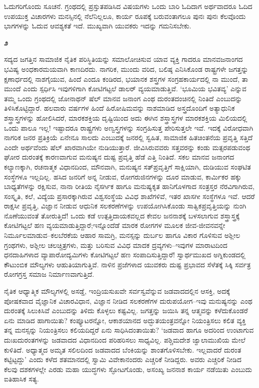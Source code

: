 ಓದುಗರಿಗೊಂದು ಸೂಚನೆ. ಗ್ರಂಥದಲ್ಲಿ ಪ್ರಸ್ತುತಪಡಿಸಿದ ವಿಷಯಗಳು ಒಂದು ಬಾರಿ ಓದಿದಾಗ ಅರ್ಥವಾದರೂ ಓದಿದ ಉಪಯುಕ್ತ ವಿಚಾರಗಳು ಮನಸ್ಸಿನಲ್ಲಿ ನೆಲೆನಿಲ್ಲಲೂ, ಕಾರ್ಯ ರೂಪಕ್ಕೆ ಬರುವಂತಾಗಲೂ ಪುನಃ ಪುನಃ ಕೆಲವೊಂದು ಭಾಗಗಳನ್ನು ಓದುವ ಆವಶ್ಯಕತೆ ಇದೆ. ಮುಖ್ಯವಾಗಿ ಯುವಕರು ಇದನ್ನು ಗಮನಿಸಬೇಕು.

\newpage

\medskip\centerline{{\Large\bfseries ೨}}

ಸದ್ಯದ ಜಗತ್ತಿನ ಸಾಮಾಜಿಕ ನೈತಿಕ ಪರಿಸ್ಥಿತಿಯನ್ನು ಸಮಾಲೋಚಿಸುವ ಯಾವ ವ್ಯಕ್ತಿ ಗಾದರೂ ಮಾನವಜನಾಂಗದ ಭವಿಷ್ಯ ಅಂಧಕಾರಮಯವಾಗಿ ಕಾಣದಿರದು. ನಾಗರಿಕ, ಮುಂದು ವರಿದ, ಬಲಿಷ್ಠ ಎನಿಸಿಕೊಂಡ ರಾಷ್ಟ್ರಗಳೇ ಜಗತ್ತನ್ನು ಕ್ಷಣಾರ್ಧದಲ್ಲಿ ನಾಶಗೈಯುವ, ಹಿಂದೆ ಎಂದೂ ಕಂಡಿರದ, ಭಯಾನಕ ಶಸ್ತ್ರಗಳ ಸಂಗ್ರಹಕಾರ್ಯದಲ್ಲಿ ನಾ ಮುಂದೆ, ತಾ ಮುಂದೆ ಎಂದು ಸ್ಪರ್ಧಿಸಿ ಇವುಗಳಿಗಾಗಿ ಕೋಟಿಗಟ್ಟಲೆ ಡಾಲರ್ ವ್ಯಯಮಾಡುತ್ತಿವೆ. ‘ಭೂಮಿಯ ಭವಿತವ್ಯ’ ಎನ್ನುವ ತಮ್ಮ ಒಂದು ಗ್ರಂಥದಲ್ಲಿ ಜೋನಾಥನ್ ಷೆಲ್ ಮಾನವ ಜನಾಂಗ ಎಂಥ ದುರಂತದಂಚಿನಲ್ಲಿ ನಿಂತಿದೆ ಎಂಬುದನ್ನು ತಿಳಿಸಿಕೊಟ್ಟಿದ್ದಾರೆ. ಹಲವಾರು ವರ್ಷಗಳ ಹಿಂದೆ ಹಿರೋಷಿಮವನ್ನು ನಾಶಮಾಡಿದ ಅಸ್ತ್ರದೊಂದಿಗೆ ಅತ್ಯಾಧುನಿಕ ಶಸ್ತ್ರಾಸ್ತ್ರಗಳನ್ನು ಹೋಲಿಸಿದರೆ, ಮಾರಕಶಕ್ತಿಯ ದೃಷ್ಟಿಯಿಂದ ಅದು ಈಗಿನ ಶಸ್ತ್ರಾಸ್ತ್ರಗಳ ಮಾರಕಶಕ್ತಿಯ ಮಿಲಿಯದಲ್ಲಿ ಒಂದು ಪಾಲೂ ಇಲ್ಲ! ಇಷ್ಟಾದರೂ ರಾಷ್ಟ್ರಗಳು ಅಣ್ವಸ್ತ್ರಗಳನ್ನು ಸಂಗ್ರಹಿಸುತ್ತ ಪೇರಿಸುತ್ತಲೇ ಇವೆ. ಇದಕ್ಕೆ ವಿರೋಧವಾಗಿ ನಾಗರಿಕ ಜನರ ಪ್ರತಿಕ್ರಿಯೆ ಏನೇನೂ ಸಾಲದು ಎಂಬುದಕ್ಕೆ ಜನರಲ್ಲಿ ಸ್ವಹಿತ, ಸಾಮಾಜಿಕ ಹಿತಚಿಂತನೆಯ ಪ್ರವೃತ್ತಿ ಸತ್ತಿದೆ ಎಂದೇ ಅರ್ಥವೆಂದು ಷೆಲ್ ಖಾರವಾಗಿಯೇ ನುಡಿಯುತ್ತಾರೆ. ಜೀವಿಸಿರುವವರು ಸತ್ತವರನ್ನು ಕಂಡು ಮತ್ಸರಪಡುವಂಥ ಘೋರ ದುರಂತಕ್ಕೆ ಕಾರಣವಾಗುವ ಮನುಷ್ಯನ ದುಷ್ಟ ಪ್ರವೃತ್ತಿ ಹೆಡೆ ಎತ್ತಿ ನಿಂತಿದೆ. ಸಕಲ ಮಾನವ ಜನಾಂಗದ ಕಲ್ಯಾಣಕ್ಕಾಗಿ, ರಚನಾತ್ಮಕ ವಿಧಾನದಿಂದ, ಮೌನವಾಗಿ, ಮನುಷ್ಯನ ಸತ್​ಪ್ರವೃತ್ತಿಗೆ ಸಾಕ್ಷಿಯಾಗಿ, ದುಡಿಯುವ ಸಂಘಟಿತ ಸಂಸ್ಥೆಗಳೂ ಇಲ್ಲದಿಲ್ಲ. ಹಸಿದ ಜನರಿಗೆ ಅನ್ನ ನೀಡುವ, ರೋಗರುಜಿನಗಳನ್ನು ದೂರ ಮಾಡುವ, ಕಾರ್ಮಿಕರ ಹಕ್ಕು ಬಾಧ್ಯತೆಗಳನ್ನು ರಕ್ಷಿಸುವ, ನಾನಾ ರೀತಿಯ ನೈಸರ್ಗಿಕ ಹಾಗೂ ಮನುಷ್ಯಕೃತ ಹಾನಿಗೊಳಗಾದ ಸಂತ್ರಸ್ತರ ನೆರವಿಗಾಗಿರುವ, ಸಂಸ್ಕೃತಿ, ಕಲೆ, ವಿದ್ಯೆಯ ಪ್ರಸಾರಕ್ಕಾಗಿರುವ ವಿಶ್ವಸಂಸ್ಥೆಯ ವಿವಿಧ ಶಾಖೆಗಳಿವೆ, ಇತರ ಖಾಸಗೀ ಸಂಸ್ಥೆಗಳೂ ಇವೆ. ಆದರೆ ರಾಕ್ಷಸೀ ಪ್ರವೃತ್ತಿ, ವಿಜ್ಞಾನ ನೀಡುವ ಆಧುನಿಕ ಸಲಕರಣೆಗಳನ್ನು ಉಪಯೋಗಿಸಿಕೊಂಡು ಸಾತ್ವಿಕಪ್ರವೃತ್ತಿಯನ್ನು ನುಂಗಿ ನೊಣೆಯುವಂತೆ ತೋರುತ್ತಿದೆ! ಒಂದು ಕಡೆ ಉತ್ಪತ್ತಿದಾಯಕವಲ್ಲದ ಕೇವಲ ಜನನಾಶಕ್ಕೆ ಬಳಸಲಾಗುವ ಶಸ್ತ್ರಾಸ್ತ್ರಕ್ಕೆ ಕೋಟಿಗಟ್ಟಲೆ ಹಣ ವ್ಯಯಮಾಡುತ್ತಿದ್ದಾರೆ;\break ಇನ್ನೊಂದೆಡೆ ಮಾರಕ ರೋಗಗಳ ಮೂಲಕ ಜೀವ-ಜೀವನವನ್ನೇ ನಿರ್ಮೂಲಮಾಡುವ–ಕಲಬೆರ\-ಕೆಯ ಆಹಾರ ಸಾಮಗ್ರಿ, ಮನಸ್ಸನ್ನು ದುರ್ಬಲ ಹಾಗೂ ವಿಕಾರ ಗೊಳಿಸುವ ಅಶ್ಲೀಲ ಗ್ರಂಥಗಳು, ಅಶ್ಲೀಲ ಚಲಚ್ಚಿತ್ರಗಳು, ಮತ್ತು ಬರಿಸುವ ವಿವಿಧ ಮಾದಕ ದ್ರವ್ಯಗಳು–ಇವುಗಳ ಮಾರಾಟದಿಂದ ಧನದಾಹಿಗಳಾದ ವ್ಯಾಪಾರೋದ್ಯಮಿಗಳು ಕೋಟಿಗಟ್ಟಲೆ ಹಣ ಸಂಪಾದಿಸುತ್ತಿದ್ದಾರೆ! ಸ್ವಾರ್ಥ\-ಮುಖದ ಅಗ್ನಿಕುಂಡದಲ್ಲಿ ಕೌಟುಂಬಿಕ ಮೌಲ್ಯಗಳು ಆಹುತಿಯಾಗುತ್ತಿವೆ. ನಾಳಿನ ಪ್ರಜೆಗಳಾದ ಯುವಕರು ದುಷ್ಟ ಪ್ರಭಾವದ ಸೆಳೆತಕ್ಕೆ ಸಿಕ್ಕಿ ಸರ್ವತ್ರ ರೋಗಗ್ರಸ್ತ ಸಮಾಜ ನಿರ್ಮಾಣವಾಗುತ್ತಿದೆ.

\newpage

ನೈತಿಕ ಆಧ್ಯಾತ್ಮಿಕ ಮೌಲ್ಯಗಳಲ್ಲಿ ಅಸಡ್ಡೆ, ಇಂದ್ರಿಯಸುಖವೇ ಸರ್ವಸ್ವವೆನ್ನುವ ಜಡವಾದ\-ದಲ್ಲಿನ ಆಸಕ್ತಿ, ಅದಕ್ಕೆ ಪೋಷಕವಾದ ವೈಜ್ಞಾನಿಕ ವಿಚಾರವಿಧಾನ, ವಿಜ್ಞಾನ ನೀಡಿದ ಸಲಕರಣೆಗಳ ದುರುಪಯೋಗ–ಇವು ಮನುಷ್ಯನನ್ನು ಎಂಥ ದುರಂತಕ್ಕೆ ಸಿಲುಕಿಸಿವೆ ಎಂಬುದನ್ನು ತಿಳಿದು ಕೊಳ್ಳಲು ಕಷ್ಟವಿಲ್ಲ. ಜಗತ್ತನ್ನು ಜಯಿಸಿ ತನ್ನ ಆತ್ಮವನ್ನು ಕಳೆದುಕೊಂಡರೆ ಏನು ಮಾಡಿದ ಹಾಗಾಯಿತು? ಕಂಪ್ಯೂಟರನ್ನೋ, ಆಕಾಶಯಾನದ ಅದ್ಭುತಯಂತ್ರವನ್ನೋ ನಿಯಂತ್ರಿಸಲು ಕಲಿತ ವ್ಯಕ್ತಿ ತನ್ನ ಮನಸ್ಸನ್ನು ನಿಯಂತ್ರಿಸಲು ಕಲಿಯದಿದ್ದರೆ ಏನು ಸಾಧಿಸಿದಂತಾಯಿತು? ‘ಜಡವಾದ ಹಾಗೂ ಅದರಿಂದ ಉಂಟಾಗುವ ದುಃಖದುರಂತಗಳನ್ನು ಜಡವಾದದ ವಿಧಾನದಿಂದ ಪರಿಹರಿಸಲು ಸಾಧ್ಯವಿಲ್ಲ. ಪಶ್ಚಿಮದೇಶ ಜ್ವಾಲಾಮುಖಿಯ ಮೇಲೆ ಕುಳಿತಿದೆ. ಅಧ್ಯಾತ್ಮದ ಅಮೃತ ಸಲಿಲದಿಂದ ಜಡವಾದದ ಬೆಂಕಿಯನ್ನು ಶಾಂತಗೊಳಿಸಬೇಕು. ಇಲ್ಲವಾದರೆ ದುರಂತ ಕಟ್ಟಿಟ್ಟದ್ದು’ ಎಂದು ಕಳೆದ ಶತಮಾನದಲ್ಲಿ ಸ್ವಾಮಿ ವಿವೇಕಾನಂದರು ಎಚ್ಚರಿಕೆ ನೀಡಿದ್ದರು. ಅವರು ಎಚ್ಚರಿಕೆ ನೀಡಿದ ಕೆಲವು ದಶಕಗಳಲ್ಲೇ ಎರಡು ಮಹಾ ಯುದ್ಧಗಳು ಸ್ಫೋಟಗೊಂಡು, ಅಸಂಖ್ಯ ಜನನಾಶ ಕಾರ್ಯ ನಡೆಯಿತು ಎಂಬುದು ಐತಿಹಾಸಿಕ ಸತ್ಯ.

